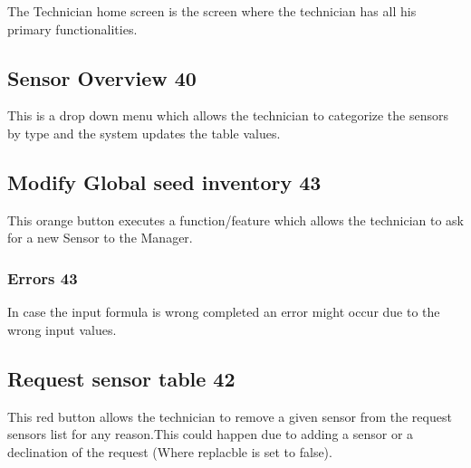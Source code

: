The Technician home screen is the screen where the technician has all his
primary functionalities.



\subsection{Sensor Overview 40}
This is a drop down menu which allows the technician to categorize the sensors
by type and the system updates the table values.

\subsection{Modify Global seed inventory 43}
This orange button executes a function/feature which allows the technician to
ask for a new Sensor to the Manager.
\subsubsection{Errors 43}
In case the input formula is wrong completed an error might occur due to the
wrong input values.


\subsection{Request sensor table 42}
This red button allows the technician to remove a given sensor from the request
sensors list for any reason.This could happen due to adding a sensor or a
declination of the request (Where replacble is set to false).


























